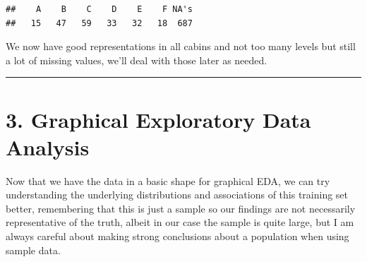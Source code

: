 \documentclass[]{article}
\newenvironment{Shaded}{\begin{snugshade}}{\end{snugshade}}
\newcommand{\KeywordTok}[1]{\textcolor[rgb]{0.13,0.29,0.53}{\textbf{#1}}}
\newcommand{\StringTok}[1]{\textcolor[rgb]{0.31,0.60,0.02}{#1}}
\newcommand{\CommentTok}[1]{\textcolor[rgb]{0.56,0.35,0.01}{\textit{#1}}}
\newcommand{\OtherTok}[1]{\textcolor[rgb]{0.56,0.35,0.01}{#1}}
\newcommand{\OperatorTok}[1]{\textcolor[rgb]{0.81,0.36,0.00}{\textbf{#1}}}
\newcommand{\NormalTok}[1]{#1}
\begin{document}
\begin{Shaded}
\end{Shaded}

\begin{verbatim}
##    A    B    C    D    E    F NA's 
##   15   47   59   33   32   18  687
\end{verbatim}

We now have good representations in all cabins and not too many levels
but still a lot of missing values, we'll deal with those later as
needed.

\begin{center}\rule{0.5\linewidth}{\linethickness}\end{center}

\section{3. Graphical Exploratory Data
Analysis}\label{graphical-exploratory-data-analysis}

Now that we have the data in a basic shape for graphical EDA, we can try
understanding the underlying distributions and associations of this
training set better, remembering that this is just a sample so our
findings are not necessarily representative of the truth, albeit in our
case the sample is quite large, but I am always careful about making
strong conclusions about a population when using sample data.
\end{document}
